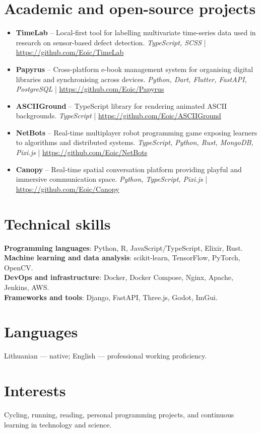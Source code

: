 \documentclass[10pt,a4paper]{article}
\newcommand{\techstack}[1]{\textcolor{black!70}{\small\textit{#1}}}
\begin{document}
\section*{Academic and open-source projects}
\begin{itemize}[leftmargin=*, topsep=0em]
  \item \textbf{TimeLab} -- Local-first tool for labelling multivariate time-series data used in research on sensor-based defect detection. \techstack{TypeScript, SCSS} | \url{https://github.com/Eoic/TimeLab}
  \item \textbf{Papyrus} -- Cross-platform e-book management system for organising digital libraries and synchronising across devices. \techstack{Python, Dart, Flutter, FastAPI, PostgreSQL} | \url{https://github.com/Eoic/Papyrus}
  \item \textbf{ASCIIGround} -- TypeScript library for rendering animated ASCII backgrounds. \techstack{TypeScript} | \url{https://github.com/Eoic/ASCIIGround}
  \item \textbf{NetBots} -- Real-time multiplayer robot programming game exposing learners to algorithms and distributed systems. \techstack{TypeScript, Python, Rust, MongoDB, Pixi.js} | \url{https://github.com/Eoic/NetBots}
  \item \textbf{Canopy} -- Real-time spatial conversation platform providing playful and immersive communication space. \techstack{Python, TypeScript, Pixi.js} | \url{https://github.com/Eoic/Canopy}
\end{itemize}

\section*{Technical skills}
\textbf{Programming languages}: Python, R, JavaScript/TypeScript, Elixir, Rust.\\
\textbf{Machine learning and data analysis}: scikit-learn, TensorFlow, PyTorch, OpenCV.\\
\textbf{DevOps and infrastructure}: Docker, Docker Compose, Nginx, Apache, Jenkins, AWS.\\
\textbf{Frameworks and tools}: Django, FastAPI, Three.js, Godot, ImGui.

\section*{Languages}
Lithuanian — native; English — professional working proficiency.

\section*{Interests}
Cycling, running, reading, personal programming projects, and continuous learning in technology and science.
\end{document}
